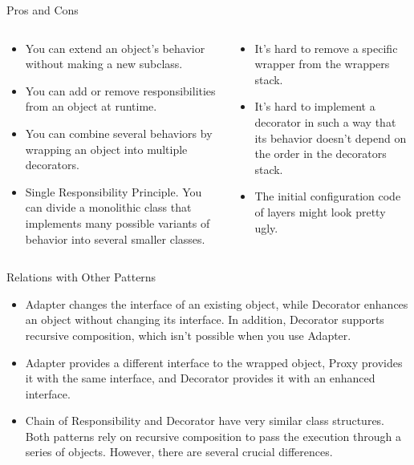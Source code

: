 \documentclass[13pt]{beamer}
\begin{document}
\begin{frame}{Pros and Cons}
	\begin{columns}[T]
		\begin{column}{.5\textwidth}
			\begin{itemize}
				\item You can extend an object’s behavior without making a new subclass.
				\item You can add or remove responsibilities from an object at runtime.
				\item You can combine several behaviors by wrapping an object into multiple decorators.
				\item Single Responsibility Principle. You can divide a monolithic class that implements many possible variants of behavior into several smaller classes.
			\end{itemize}
		\end{column}
	
		\begin{column}{.5\textwidth}
			\begin{itemize}
				\item It’s hard to remove a specific wrapper from the wrappers stack.
				\item It’s hard to implement a decorator in such a way that its behavior doesn’t depend on the order in the decorators stack.
				\item The initial configuration code of layers might look pretty ugly.
			\end{itemize}
		\end{column}
	\end{columns}
\end{frame}

\begin{frame}{Relations with Other Patterns}
	\begin{itemize}
		\item Adapter changes the interface of an existing object, while Decorator enhances an object without changing its interface. In addition, Decorator supports recursive composition, which isn’t possible when you use Adapter.
		\item Adapter provides a different interface to the wrapped object, Proxy provides it with the same interface, and Decorator provides it with an enhanced interface.
		\item Chain of Responsibility and Decorator have very similar class structures. Both patterns rely on recursive composition to pass the execution through a series of objects. However, there are several crucial differences.
	\end{itemize}
\end{frame}
\end{document}
